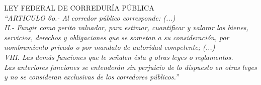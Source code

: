 \textcolor{principal}{LEY FEDERAL DE CORREDUR\'IA P\'UBLICA}\\[10pt]

\textit{``ARTICULO 6o.- Al corredor p\'ublico corresponde: (...)}\\[10pt]

\textit{II.- Fungir como perito valuador, para estimar, cuantificar y valorar los bienes, servicios, derechos y obligaciones que se sometan a su consideraci\'on, por nombramiento privado o por mandato de autoridad competente; (...)}\\[10pt]

\textit{VIII. Las dem\'as funciones que le se\~nalen \'esta y otras leyes o reglamentos.}\\[10pt]

\textit{Las anteriores funciones se entender\'an sin perjuicio de lo dispuesto en otras leyes y no se consideran exclusivas de los corredores p\'ublicos.'' }\\[10pt]

